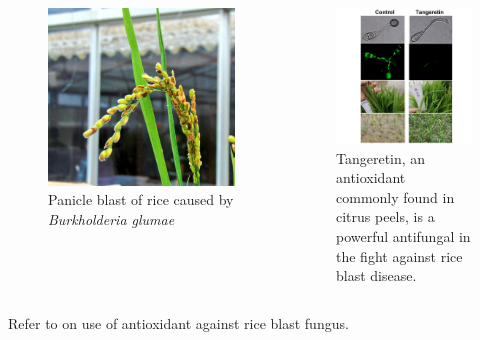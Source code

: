 \documentclass[10pt,dvipsnames,ignorenonframetext,aspectratio=169]{beamer}
\begin{document}
\begin{frame}{}
\protect\hypertarget{section-16}{}
\begin{columns}[T, onlytextwidth]

\begin{figure}
\includegraphics[width=0.84\linewidth]{../images/panicle_bast_rice} \caption{Panicle blast of rice caused by \textit{Burkholderia glumae}}\label{fig:rice-panicle-blast}
\end{figure}


\begin{figure}
\includegraphics[width=0.85\linewidth]{../images/citrus_peel_for_blast_control} \caption{Tangeretin, an antioxidant commonly found in citrus peels, is a powerful antifungal in the fight against rice blast disease.}\label{fig:citrus-peel-rescuse}
\end{figure}

\end{columns}

\footnotesize Refer to \citet{liang2021tangeretin} on use of antioxidant
against rice blast fungus.
\end{frame}
\end{document}
